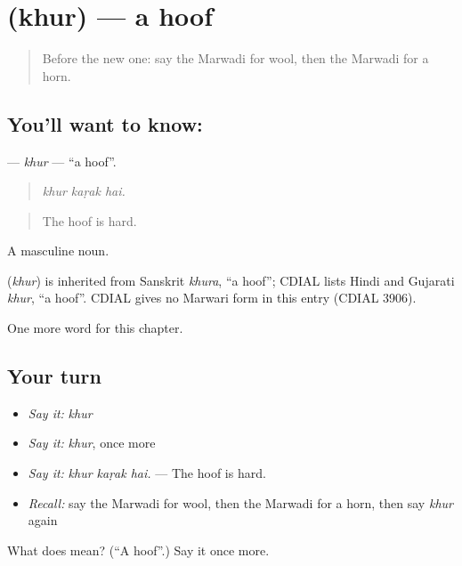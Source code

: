 \section[\texorpdfstring{\mw{खुर} (khur)}{खुर (khur)}]{ (khur) — a hoof}

\label{lesson:MW-C236-khur}



\begin{quote}
Before the new one: say the Marwadi for wool, then the Marwadi for a horn.
\end{quote}

\subsection*{You'll want to know: }
\textbf{} — \emph{khur} — \textquotedblleft{}a hoof\textquotedblright{}.

\begin{quote}
  
\end{quote}

\begin{quote}
\emph{khur kaṛak hai.}
\end{quote}

\begin{quote}
The hoof is hard.
\end{quote}

A masculine noun.

\begin{cousinweb}
\textbf{} (\emph{khur}) is inherited from Sanskrit \emph{khura}, \textquotedblleft{}a hoof\textquotedblright{}; CDIAL lists Hindi and Gujarati \emph{khur}, \textquotedblleft{}a hoof\textquotedblright{}. CDIAL gives no Marwari form in this entry (CDIAL 3906).
\end{cousinweb}

\begin{grammarlens}[title={What you've built}]
One more word for this chapter.
\end{grammarlens}

\subsection*{Your turn}
\begin{itemize}
\raggedright
  \item \emph{Say it:} \emph{khur}
  \item \emph{Say it:} \emph{khur}, once more
  \item \emph{Say it:} \emph{khur kaṛak hai.} — The hoof is hard.
  \item \emph{Recall:} say the Marwadi for wool, then the Marwadi for a horn, then say \emph{khur} again
\end{itemize}

\begin{tcolorbox}[breakable,colback=teal!4,colframe=teal!35!black,title={Before you move on}]
What does  mean? (\textquotedblleft{}A hoof\textquotedblright{}.) Say it once more.
\end{tcolorbox}
